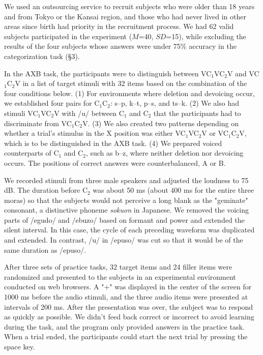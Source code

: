 \documentclass[a4paper,11pt,twocolumn]{article}
\begin{document}
We used an outsourcing service to recruit subjects who were older than 18 years and from Tokyo or the Kansai region, and those who had never lived in other areas since birth had priority in the recruitment process. We had 62 valid subjects participated in the experiment ($M$=40, $SD$=15), while excluding the results of the four subjects whose answers were under 75\% accuracy in the categorization task (\S3).

In the AXB task, the participants were to distinguish between VC$_\text{1}$VC$_\text{2}$V and VC$_\text{1}$C$_\text{2}$V in a list of target stimuli with 32 items based on the combination of the four conditions below. (1) For environments where deletion and devoicing occur, we established four pairs for C$_\text{1}$C$_\text{2}$: s--p, k--t, p--s, and ts--k. (2) We also had stimuli VC$_\text{1}$VC$_\text{2}$V with /u/ between C$_\text{1}$ and C$_\text{2}$ that the participants had to discriminate from VC$_\text{1}$C$_\text{2}$V. (3) We also created two patterns depending on whether a trial's stimulus in the X position was either VC$_\text{1}$VC$_\text{2}$V or VC$_\text{1}$C$_\text{2}$V, which is to be distinguished in the AXB task. (4) We prepared voiced counterparts of C$_\text{1}$ and C$_\text{2}$, such as b--z, where neither deletion nor devoicing occurs. The positions of correct answers were counterbalanced, A or B.

We recorded stimuli from three male speakers and adjusted the loudness to 75 dB. The duration before C$_\text{2}$ was about 50 ms (about 400 ms for the entire three moras) so that the subjects would not perceive a long blank as the "geminate" consonant, a distinctive phoneme \textit{sokuon} in Japanese. We removed the voicing parts of /egudo/ and /ebuzo/ based on formant and power and extended the silent interval. In this case, the cycle of each preceding waveform was duplicated and extended. In contrast, /u/ in /epuso/ was cut so that it would be of the same duration as /epuso/.

After three sets of practice tasks, 32 target items and 24 filler items were randomized and presented to the subjects in an experimental environment conducted on web browsers. A "+" was displayed in the center of the screen for 1000 ms before the audio stimuli, and the three audio items were presented at intervals of 200 ms. After the presentation was over, the subject was to respond as quickly as possible. We didn't feed back correct or incorrect to avoid learning during the task, and the program only provided answers in the practice task. When a trial ended, the participants could start the next trial by pressing the space key.
\end{document}
